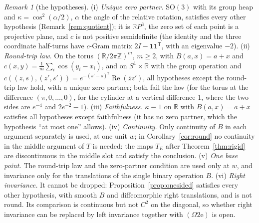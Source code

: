 \documentclass[11pt,reqno]{amsart}
\theoremstyle{definition}
\theoremstyle{remark}
\newtheorem{remark}[theorem]{Remark}
\numberwithin{equation}{section}
\newcommand{\R}{\mathbb{R}}
\newcommand{\Z}{\mathbb{Z}}
\newcommand{\re}{\operatorname{Re}}
\newcommand{\SO}{\mathrm{SO}}
\begin{document}
\begin{remark}[the hypotheses]\label{rem:roundaudit}
(i) \emph{Unique zero partner.}  $\SO(3)$ with its group heap and $\kappa=\cos^2(\alpha/2)$, $\alpha$ the angle of the relative rotation,
satisfies every other hypothesis (Remark~\ref{rem:quotient}); it is $\R P^3$, the zero set of each point is a projective plane, and $c$ is not
positive semidefinite (the identity and the three coordinate half-turns have $c$-Gram matrix $2I-\mathbf 1\mathbf 1^{\mathsf T}$, with an
eigenvalue $-2$).  (ii) \emph{Round-trip law.}  On the torus $(\R/2\pi\Z)^m$, $m\ge2$, with $B(a,x)=a+x$ and $c(x,y)=\frac1m\sum_i\cos(y_i-x_i)$,
and on $S^1\times\R$ with the group operation and $c((z,s),(z',s'))=e^{-(s'-s)^2}\re(\bar zz')$, all hypotheses except the round-trip law
hold, with a unique zero partner; both fail the law (for the torus at the difference $(\pi,0,\dots,0)$, for the cylinder at a vertical
difference $1$, where the two sides are $e^{-4}$ and $2e^{-2}-1$).  (iii) \emph{Faithfulness.}  $\kappa\equiv1$ on $\R$ with $B(a,x)=a+x$ satisfies
all hypotheses except faithfulness (it has no zero partner, which the hypothesis ``at most one'' allows).  (iv) \emph{Continuity.}  Only
continuity of $B$ in each argument separately is used, at one unit $w$; in Corollary~\ref{cor:round} no continuity in the middle argument
of $T$ is needed: the maps $T_E$ after Theorem~\ref{thm:rigid} are discontinuous in the middle slot and satisfy the conclusion.
(v) \emph{One base point.}  The round-trip law and the zero-partner condition are used only at $w$, and invariance only for the
translations of the single binary operation $B$.  (vi) \emph{Right invariance.}  It cannot be dropped: Proposition~\ref{prop:onesided}
satisfies every other hypothesis, with smooth $B$ and diffeomorphic right translations, and is not round.  Its comparison is continuous
but not $C^2$ on the diagonal, so whether right invariance can be replaced by left invariance together with $(\Omega2\mathrm e)$ is open.
\end{remark}
\end{document}
